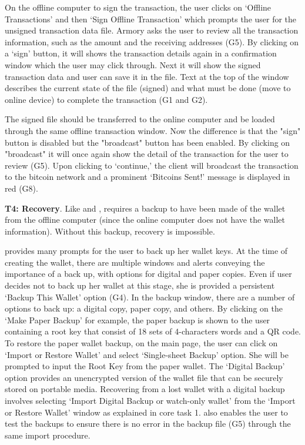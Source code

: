 On the offline computer to sign the transaction, the user clicks on `Offline Transactions' and then `Sign Offline Transaction' which prompts the user for the unsigned transaction data file. Armory asks the user to review all the transaction information, such as the amount and the receiving addresses (G5). By clicking on a `sign' button, it will shows the transaction details again in a confirmation window which the user may click through. Next it will show the signed transaction data and user can save it in the file. Text at the top of the window describes the current state of the file (signed) and what must be done (move to online device) to complete the transaction (G1 and G2).

The signed file should be transferred to the online computer and be loaded through the same offline transaction window. Now the difference is that the "sign" button is disabled but the "broadcast" button has been enabled. By clicking on "broadcast" it will once again show the detail of the transaction for the user to review (G5). Upon clicking to `continue,' the client will broadcast the transaction to the bitcoin network and a prominent `Bitcoins Sent!' message is displayed in red (G8).

\textbf{T4: Recovery}.
Like \bitcoinclient and \multibit, \armory requires a backup to have been made of the wallet from the offline computer (since the online computer does not have the wallet information). Without this backup, recovery is impossible.

\armory provides many prompts for the user to back up her wallet keys. At the time of creating the wallet, there are multiple windows and alerts conveying the importance of a back up, with options for digital and paper copies. Even if user decides not to back up her wallet at this stage, she is provided a persistent `Backup This Wallet' option (G4). In the backup window, there are a number of options to back up: a digital copy, paper copy, and others. By clicking on the `Make Paper Backup' for example, the paper backup is shown to the user containing a root key that consist of 18 sets of 4-characters words and a QR code. To restore the paper wallet backup, on the main page, the user can click on `Import or Restore Wallet' and select `Single-sheet Backup' option. She will be prompted to input the Root Key from the paper wallet. The `Digital Backup' option provides an unencrypted version of the wallet file that can be securely stored on portable media. Recovering from a lost wallet with a digital backup involves selecting `Import Digital Backup or watch-only wallet' from the `Import or Restore Wallet' window as explained in core task 1. \armory also enables the user to test the backups to ensure there is no error in the backup file (G5) through the same import procedure.

